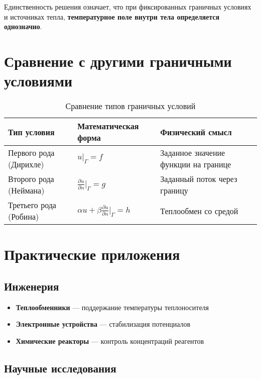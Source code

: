 \documentclass[12pt]{article}
\begin{document}
	Единственность решения означает, что при фиксированных граничных условиях и источниках тепла, \textbf{температурное поле внутри тела определяется однозначно}.
	
	\section{Сравнение с другими граничными условиями}
	
	\begin{table}[H]
		\centering
		\caption{Сравнение типов граничных условий}
		\begin{tabular}{|p{}|p{}|p{}|}
			\hline
			\textbf{Тип условия} & \textbf{Математическая форма} & \textbf{Физический смысл} \\
			\hline
			Первого рода (Дирихле) & $u|_{\Gamma} = f$ & Заданное значение функции на границе \\
			\hline
			Второго рода (Неймана) & $\frac{\partial u}{\partial n}|_{\Gamma} = g$ & Заданный поток через границу \\
			\hline
			Третьего рода (Робина) & $\alpha u + \beta\frac{\partial u}{\partial n}|_{\Gamma} = h$ & Теплообмен со средой \\
			\hline
		\end{tabular}
	\end{table}
	
	\section{Практические приложения}
	
	\subsection{Инженерия}
	
	\begin{itemize}
		\item \textbf{Теплообменники} — поддержание температуры теплоносителя
		\item \textbf{Электронные устройства} — стабилизация потенциалов
		\item \textbf{Химические реакторы} — контроль концентраций реагентов
	\end{itemize}
	
	\subsection{Научные исследования}
	
\end{document}
